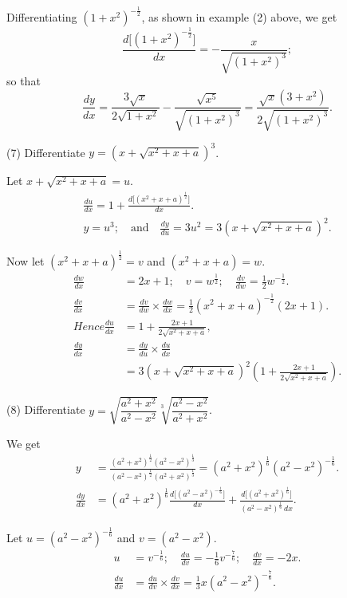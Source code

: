 \documentclass{ximera}
\begin{document}
Differentiating $(1+x^2)^{-\frac{1}{2}}$, as shown in example (2)
above, we get
\[
\frac{d\bigl[(1+x^2)^{-\frac{1}{2}}\bigr]}{dx} = - \frac{x}{\sqrt{(1+x^2)^3}};
\]
so that
\[
\frac{dy}{dx}
  = \frac{3\sqrt{x}}{2\sqrt{1+x^2}} - \frac{\sqrt{x^5}}{\sqrt{(1+x^2)^3}}
  = \frac{\sqrt{x}(3+x^2)}{2\sqrt{(1+x^2)^3}}.
\]


(7) Differentiate $y=(x+\sqrt{x^2+x+a})^3$.

Let $x+\sqrt{x^2+x+a}=u$.
\begin{gather*}
\frac{du}{dx} = 1 + \frac{d\bigl[(x^2+x+a)^{\frac{1}{2}}\bigr]}{dx}. \\
y = u^3;\quad\text{and}\quad \frac{dy}{du} = 3u^2= 3\left(x+\sqrt{x^2+x+a}\right)^2.
\end{gather*}

Now let $(x^2+x+a)^{\frac{1}{2}}=v$ and $(x^2+x+a) = w$.
\begin{align*}
\frac{dw}{dx}
  &= 2x+1;\quad v = w^{\frac{1}{2}};\quad \frac{dv}{dw} = \tfrac{1}{2}w^{-\frac{1}{2}}. \\
\frac{dv}{dx}
  &= \frac{dv}{dw} \times \frac{dw}{dx} = \tfrac{1}{2}(x^2+x+a)^{-\frac{1}{2}}(2x+1). \\
   Hence
\frac{du}{dx}
  &= 1 + \frac{2x+1}{2\sqrt{x^2+x+a}}, \\
\frac{dy}{dx}
  &= \frac{dy}{du} \times \frac{du}{dx}\\
  &= 3\left(x+\sqrt{x^2+x+a}\right)^2
      \left(1 +\frac{2x+1}{2\sqrt{x^2+x+a}}\right).
\end{align*}

(8) Differentiate $y=\sqrt{\dfrac{a^2+x^2}{a^2-x^2}} \sqrt[3]{\dfrac{a^2-x^2}{a^2+x^2}}$.

We get
\begin{align*}
y &= \frac{(a^2+x^2)^{\frac{1}{2}} (a^2-x^2)^{\frac{1}{3}}}
          {(a^2-x^2)^{\frac{1}{2}} (a^2+x^2)^{\frac{1}{3}}}
  = (a^2+x^2)^{\frac{1}{6}} (a^2-x^2)^{-\frac{1}{6}}. \\
\frac{dy}{dx}
  &= (a^2+x^2)^{\frac{1}{6}} \frac{d\bigl[(a^2-x^2)^{-\frac{1}{6}}\bigr]}{dx}
   + \frac{d\bigl[(a^2+x^2)^{\frac{1}{6}}\bigr]}{(a^2-x^2)^{\frac{1}{6}}\, dx}.
\end{align*}

Let $u = (a^2-x^2)^{-\frac{1}{6}}$ and $v = (a^2 - x^2)$.
\begin{align*}
u &= v^{-\frac{1}{6}};\quad
  \frac{du}{dv} = -\frac{1}{6}v^{-\frac{7}{6}};\quad
  \frac{dv}{dx} = -2x. \\
\frac{du}{dx} &= \frac{du}{dv} \times \frac{dv}{dx} = \frac{1}{3}x(a^2-x^2)^{-\frac{7}{6}}.
\end{align*}
\end{document}
